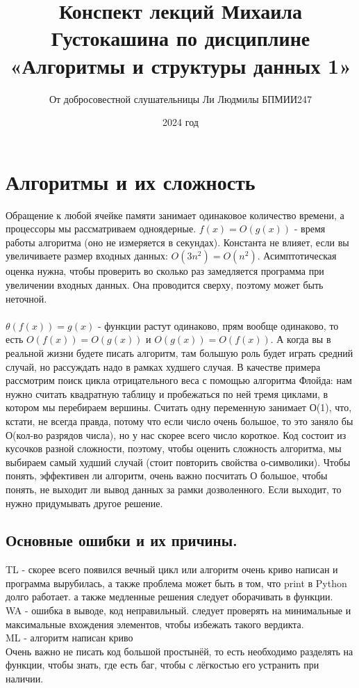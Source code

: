\documentclass[a4paper,12pt]{article}
\title{Конспект лекций Михаила Густокашина по дисциплине «Алгоритмы и структуры данных 1»}
\author{От добросовестной слушательницы Ли Людмилы БПМИИ247}
\date{2024 год}
\begin{document}
\newpage
\maketitle
\section{Алгоритмы и их сложность}
Обращение к любой ячейке памяти занимает одинаковое количество времени, а процессоры мы рассматриваем одноядерные. $f(x) = O(g(x))$ - время работы алгоритма (оно не измеряется в секундах). Константа не влияет, если вы увеличиваете размер входных данных: $O(3n^2) = O(n^2)$. Асимптотическая оценка нужна, чтобы проверить во сколько раз замедляется программа при увеличении входных данных. Она проводится сверху, поэтому может быть неточной. \\
\\
$\theta(f(x)) = g(x)$ - функции растут одинаково, прям вообще одинаково, то есть $O(f(x)) = O(g(x))$ и $O(g(x)) = O(f(x))$. А когда вы в реальной жизни будете писать алгоритм, там большую роль будет играть средний случай, но рассуждать надо в рамках худшего случая. В качестве примера рассмотрим поиск цикла отрицательного веса с помощью алгоритма Флойда: нам нужно считать квадратную таблицу и пробежаться по ней тремя циклами, в котором мы перебираем вершины. Считать одну переменную занимает О(1), что, кстати, не всегда правда, потому что если число очень большое, то это заняло бы О(кол-во разрядов числа), но у нас скорее всего число короткое. Код состоит из кусочков разной сложности, поэтому, чтобы оценить сложность алгоритма, мы выбираем самый худший случай (стоит повторить свойства о-символики). Чтобы понять, эффективен ли алгоритм, очень важно посчитать О большое, чтобы понять, не выходит ли вывод данных за рамки дозволенного. Если выходит, то нужно придумывать другое решение.
\subsection{Основные ошибки и их причины.} TL - скорее всего появился вечный цикл или алгоритм очень криво написан и программа вырубилась, а также проблема может быть в том, что print в Python долго работает. а также медленные решения следует оборачивать в функции.\\
WA - ошибка в выводе, код неправильный. следует проверять на минимальные и максимальные вхождения элементов, чтобы избежать такого вердикта.\\
ML - алгоритм написан криво\\
Очень важно не писать код большой простынёй, то есть необходимо разделять на функции, чтобы знать, где есть баг, чтобы с лёгкостью его устранить при наличии. \\
\newpage
\end{document}
